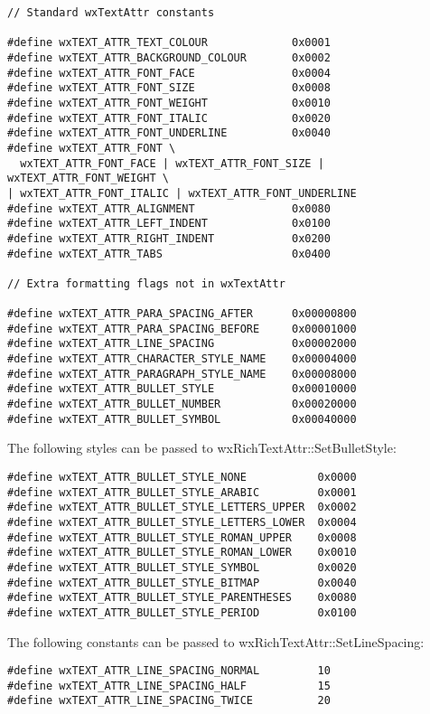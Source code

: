 {\small
\begin{verbatim}
// Standard wxTextAttr constants

#define wxTEXT_ATTR_TEXT_COLOUR             0x0001
#define wxTEXT_ATTR_BACKGROUND_COLOUR       0x0002
#define wxTEXT_ATTR_FONT_FACE               0x0004
#define wxTEXT_ATTR_FONT_SIZE               0x0008
#define wxTEXT_ATTR_FONT_WEIGHT             0x0010
#define wxTEXT_ATTR_FONT_ITALIC             0x0020
#define wxTEXT_ATTR_FONT_UNDERLINE          0x0040
#define wxTEXT_ATTR_FONT \
  wxTEXT_ATTR_FONT_FACE | wxTEXT_ATTR_FONT_SIZE | wxTEXT_ATTR_FONT_WEIGHT \
| wxTEXT_ATTR_FONT_ITALIC | wxTEXT_ATTR_FONT_UNDERLINE
#define wxTEXT_ATTR_ALIGNMENT               0x0080
#define wxTEXT_ATTR_LEFT_INDENT             0x0100
#define wxTEXT_ATTR_RIGHT_INDENT            0x0200
#define wxTEXT_ATTR_TABS                    0x0400

// Extra formatting flags not in wxTextAttr

#define wxTEXT_ATTR_PARA_SPACING_AFTER      0x00000800
#define wxTEXT_ATTR_PARA_SPACING_BEFORE     0x00001000
#define wxTEXT_ATTR_LINE_SPACING            0x00002000
#define wxTEXT_ATTR_CHARACTER_STYLE_NAME    0x00004000
#define wxTEXT_ATTR_PARAGRAPH_STYLE_NAME    0x00008000
#define wxTEXT_ATTR_BULLET_STYLE            0x00010000
#define wxTEXT_ATTR_BULLET_NUMBER           0x00020000
#define wxTEXT_ATTR_BULLET_SYMBOL           0x00040000
\end{verbatim}
}

The following styles can be passed to wxRichTextAttr::SetBulletStyle:

{\small
\begin{verbatim}
#define wxTEXT_ATTR_BULLET_STYLE_NONE           0x0000
#define wxTEXT_ATTR_BULLET_STYLE_ARABIC         0x0001
#define wxTEXT_ATTR_BULLET_STYLE_LETTERS_UPPER  0x0002
#define wxTEXT_ATTR_BULLET_STYLE_LETTERS_LOWER  0x0004
#define wxTEXT_ATTR_BULLET_STYLE_ROMAN_UPPER    0x0008
#define wxTEXT_ATTR_BULLET_STYLE_ROMAN_LOWER    0x0010
#define wxTEXT_ATTR_BULLET_STYLE_SYMBOL         0x0020
#define wxTEXT_ATTR_BULLET_STYLE_BITMAP         0x0040
#define wxTEXT_ATTR_BULLET_STYLE_PARENTHESES    0x0080
#define wxTEXT_ATTR_BULLET_STYLE_PERIOD         0x0100
\end{verbatim}
}

The following constants can be passed to wxRichTextAttr::SetLineSpacing:

{\small
\begin{verbatim}
#define wxTEXT_ATTR_LINE_SPACING_NORMAL         10
#define wxTEXT_ATTR_LINE_SPACING_HALF           15
#define wxTEXT_ATTR_LINE_SPACING_TWICE          20
\end{verbatim}
}

